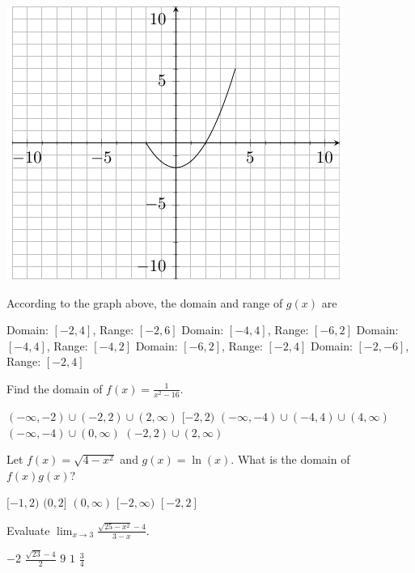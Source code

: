 \documentclass[11pt]{article}
\begin{document}
\begin{questions}
\begin{multiplechoice}{5}
\begin{minipage}{\linewidth}%
\centering
\makebox[\linewidth]{}
\includegraphics{exam1graph2.pdf}
\label{graph2exam1}%
\end{minipage}
According to the graph above, the domain and range of $g(x)$ are
\begin{answers}{2}
\ans Domain: $[-2,4]$, Range: $[-2,6]$
\ans Domain: $[-4,4]$, Range: $[-6,2]$
\ans Domain: $[-4,4]$, Range: $[-4,2]$
\ans Domain: $[-6,2]$, Range: $[-2,4]$
\ans Domain: $[-2,-6]$, Range: $[-2,4]$
\end{answers}

\question Find the domain of $f(x) = \frac{1}{x^2 - 16}$.
\begin{answers}{2}
\ans  $(-\infty, -2) \cup (-2,2) \cup (2, \infty)$
\ans $[-2,2)$
\ans $(-\infty, -4) \cup (-4,4) \cup (4, \infty) $
\ans  $(-\infty, -4) \cup (0, \infty)$
\ans $(-2,2) \cup (2, \infty)$
\end{answers}


\question Let $f(x) = \sqrt{4-x^2}$ and $g(x)=\ln(x)$.  What is the domain of $f(x)g(x)$?
\begin{answers}{2}
\ans $[-1,2)$
\ans $(0,2]$
\ans $(0,\infty)$
\ans $[-2,\infty)$
\ans $[-2,2]$
\end{answers}

\newpage


\question Evaluate $\displaystyle \lim_{x \to 3} \frac{\sqrt{25-x^2} - 4}{3-x}$.
\begin{answers}{3}
\ans $-2$
\ans $\frac{\sqrt{23} - 4}{2}$
\ans $9$
\ans $1$
\ans $\frac{3}{4}$
\end{answers}




\end{multiplechoice}
\end{questions}
\end{document}
